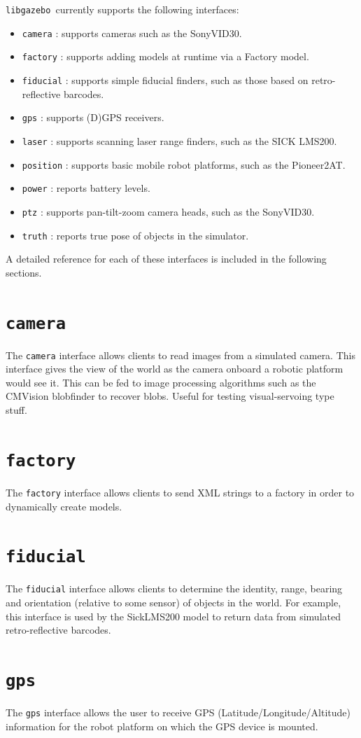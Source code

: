 \documentclass[11pt]{report}
\def\libgazebo {{\tt libgazebo}~}
\newcommand{\newinterface}[1]{\newpage \section{{\tt #1}}}
\begin{document}
\libgazebo currently supports the following interfaces:
\begin{itemize}
\item {\tt camera} : supports cameras such as the SonyVID30.
\item {\tt factory} : supports adding models at runtime via a Factory model.
\item {\tt fiducial} : supports simple fiducial finders, such as those based on
retro-reflective barcodes.
\item {\tt gps} : supports (D)GPS receivers.
\item {\tt laser} : supports scanning laser range finders, such as the SICK LMS200.
\item {\tt position} : supports basic mobile robot platforms, such as the Pioneer2AT.
\item {\tt power} : reports battery levels.
\item {\tt ptz} : supports pan-tilt-zoom camera heads, such as the SonyVID30.
\item {\tt truth} : reports true pose of objects in the simulator.
\end{itemize}
A detailed reference for each of these interfaces is included in the
following sections.

\newinterface{camera}

The {\tt camera} interface allows clients to read images from a
simulated camera. This interface gives the view of the world as the
camera onboard a robotic platform would see it. This can be fed to
image processing algorithms such as the CMVision blobfinder to recover
blobs. Useful for testing visual-servoing type stuff.



 
\newinterface{factory}

The {\tt factory} interface allows clients to send XML strings to a 
factory in order to dynamically create models.




\newinterface{fiducial}

The {\tt fiducial} interface allows clients to determine the identity,
range, bearing and orientation (relative to some sensor) of objects in
the world.  For example, this interface is used by the SickLMS200
model to return data from simulated retro-reflective barcodes.



\newinterface{gps}

The {\tt gps} interface allows the user to receive GPS
(Latitude/Longitude/Altitude) information for the robot platform on
which the GPS device is mounted.
\end{document}
